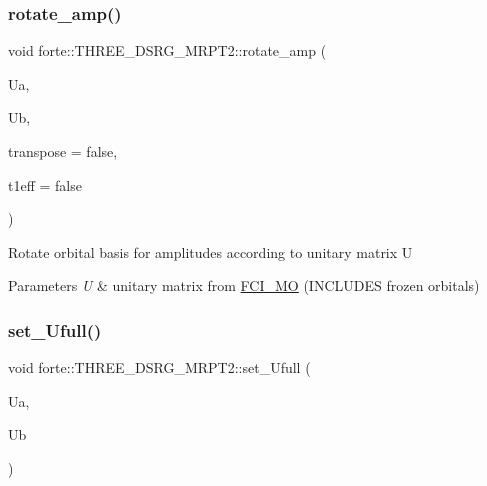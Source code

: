 \subsubsection{\texorpdfstring{rotate\+\_\+amp()}{rotate\_amp()}}
{\footnotesize\ttfamily void forte\+::\+T\+H\+R\+E\+E\+\_\+\+D\+S\+R\+G\+\_\+\+M\+R\+P\+T2\+::rotate\+\_\+amp (\begin{DoxyParamCaption}\item[{psi\+::\+Shared\+Matrix}]{Ua,  }\item[{psi\+::\+Shared\+Matrix}]{Ub,  }\item[{const bool \&}]{transpose = {\ttfamily false},  }\item[{const bool \&}]{t1eff = {\ttfamily false} }\end{DoxyParamCaption})}

Rotate orbital basis for amplitudes according to unitary matrix U 
\begin{DoxyParams}{Parameters}
{\em U} & unitary matrix from \mbox{\hyperlink{classforte_1_1_f_c_i___m_o}{F\+C\+I\+\_\+\+MO}} (I\+N\+C\+L\+U\+D\+ES frozen orbitals) \\
\hline
\end{DoxyParams}
\mbox{\label{classforte_1_1_t_h_r_e_e___d_s_r_g___m_r_p_t2_a715a85f86bbbc3af62644acde4e3c4d2}} 
\subsubsection{\texorpdfstring{set\+\_\+\+Ufull()}{set\_Ufull()}}
{\footnotesize\ttfamily void forte\+::\+T\+H\+R\+E\+E\+\_\+\+D\+S\+R\+G\+\_\+\+M\+R\+P\+T2\+::set\+\_\+\+Ufull (\begin{DoxyParamCaption}\item[{psi\+::\+Shared\+Matrix \&}]{Ua,  }\item[{psi\+::\+Shared\+Matrix \&}]{Ub }\end{DoxyParamCaption})}

\mbox{\label{classforte_1_1_t_h_r_e_e___d_s_r_g___m_r_p_t2_aa0b9829e2f4e0d6f1ac69db54c650d73}} 
